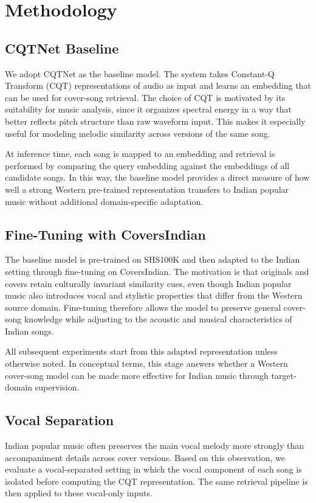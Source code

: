 \documentclass[conference]{IEEEtran}
\begin{document}
\section{Methodology}

\subsection{CQTNet Baseline}
We adopt CQTNet as the baseline model. The system takes Constant-Q Transform (CQT) representations of audio as input and learns an embedding that can be used for cover-song retrieval. The choice of CQT is motivated by its suitability for music analysis, since it organizes spectral energy in a way that better reflects pitch structure than raw waveform input. This makes it especially useful for modeling melodic similarity across versions of the same song.

At inference time, each song is mapped to an embedding and retrieval is performed by comparing the query embedding against the embeddings of all candidate songs. In this way, the baseline model provides a direct measure of how well a strong Western pre-trained representation transfers to Indian popular music without additional domain-specific adaptation.

\subsection{Fine-Tuning with CoversIndian}
The baseline model is pre-trained on SHS100K and then adapted to the Indian setting through fine-tuning on CoversIndian. The motivation is that originals and covers retain culturally invariant similarity cues, even though Indian popular music also introduces vocal and stylistic properties that differ from the Western source domain. Fine-tuning therefore allows the model to preserve general cover-song knowledge while adjusting to the acoustic and musical characteristics of Indian songs.

All subsequent experiments start from this adapted representation unless otherwise noted. In conceptual terms, this stage answers whether a Western cover-song model can be made more effective for Indian music through target-domain supervision.

\subsection{Vocal Separation}
Indian popular music often preserves the main vocal melody more strongly than accompaniment details across cover versions. Based on this observation, we evaluate a vocal-separated setting in which the vocal component of each song is isolated before computing the CQT representation. The same retrieval pipeline is then applied to these vocal-only inputs.
\end{document}
